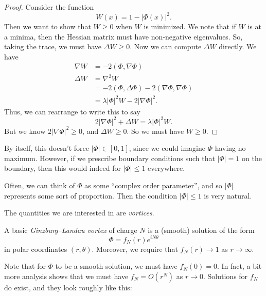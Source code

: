 \documentclass[a4paper]{article}
\begin{document}
\begin{proof}
  Consider the function
  \[
    W(x) = 1 - |\Phi(x)|^2.
  \]
  Then we want to show that $W \geq 0$ when $W$ is minimized. We note that if $W$ is at a minima, then the Hessian matrix must have non-negative eigenvalues. So, taking the trace, we must have $\Delta W \geq 0$. Now we can compute $\Delta W$ directly. We have
  \begin{align*}
    \nabla W &= -2 (\Phi, \nabla \Phi)\\
    \Delta W &= \nabla^2 W \\
    &= - 2(\Phi, \Delta \Phi) - 2(\nabla \Phi, \nabla \Phi)\\
    &= \lambda |\Phi|^2 W - 2 |\nabla \Phi|^2.
  \end{align*}
  Thus, we can rearrange to write this to say
  \[
    2 |\nabla \Phi|^2 + \Delta W = \lambda |\Phi|^2 W.
  \]
  But we know $2 |\nabla \Phi|^2 \geq 0$, and $\Delta W \geq 0$. So we must have $W \geq 0$.
\end{proof}

By itself, this doesn't force $|\Phi| \in [0, 1]$, since we could imagine $\Phi$ having no maximum. However, if we prescribe boundary conditions such that $|\Phi| = 1$ on the boundary, then this would indeed for $|\Phi| \leq 1$ everywhere.

Often, we can think of $\Phi$ as some ``complex order parameter'', and so $|\Phi|$ represents some sort of proportion. Then the condition $|\Phi| \leq 1$ is very natural.

The quantities we are interested in are \emph{vortices}.

\begin{defi}
  A basic \emph{Ginzburg--Landau vortex} of charge $N$ is a (smooth) solution of the form
  \[
    \Phi = f_N(r) e^{iN\theta}
  \]
  in polar coordinates $(r, \theta)$. Moreover, we require that $f_N(r) \to 1$ as $r \to \infty$.
\end{defi}
Note that for $\Phi$ to be a smooth solution, we must have $f_N(0) = 0$. In fact, a bit more analysis shows that we must have $f_N = O(r^N)$ as $r \to 0$. Solutions for $f_N$ do exist, and they look roughly like this:

\begin{center}
\end{center}
\end{document}
